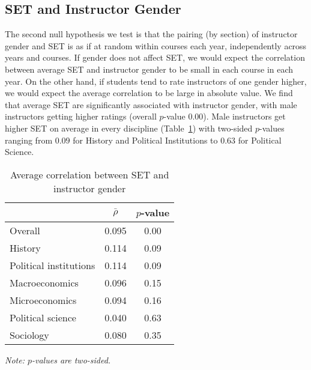 \documentclass[12pt]{article}
\begin{document}
\subsection{SET and Instructor Gender} \label{sec:Fr-set-gender}
The second null hypothesis we test is that the pairing (by section) of 
instructor gender and SET is as if at random within courses each year, independently
across years and courses.
If gender does not affect SET, we would expect the correlation between average SET
and instructor gender to be small in each course in each year.
On the other hand, if students tend to rate instructors of one gender higher, we would
expect the average correlation to be large in absolute value.
We find that average SET are significantly associated with instructor gender, with male instructors
getting higher ratings (overall $p$-value 0.00). 
Male instructors get higher SET on average in every discipline  (Table~\ref{tab:instructorgender})
with two-sided $p$-values ranging from $0.09$ for 
History and Political Institutions to $0.63$ for Political Science.

\begin{table}[htbp]
  \centering
  \footnotesize 
  \caption{Average correlation between SET and instructor gender}
    \begin{tabular}{lcc}
    \toprule 
                          & $\bar{\rho}$  & $p$-value     \\
   \midrule
    Overall &                 0.095       & 0.00     \\
    History &                 0.114       & 0.09     \\
    Political institutions &  0.114       & 0.09     \\
    Macroeconomics &          0.096       & 0.15     \\
    Microeconomics &          0.094       & 0.16     \\
    Political science &      0.040       & 0.63     \\
    Sociology &               0.080       & 0.35     \\
    \bottomrule
    \end{tabular}%
 \label{tab:instructorgender}%
  
  \textit{Note: $p$-values are two-sided.}
\end{table}%
\normalsize
\end{document}
